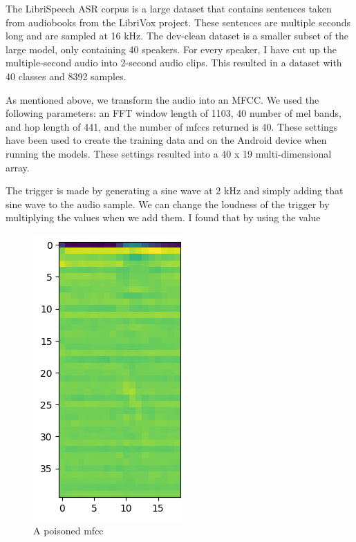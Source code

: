 \documentclass{article}
\theoremstyle{definition}
\theoremstyle{remark}
\begin{document}
The LibriSpeech ASR corpus is a large dataset that contains sentences taken from audiobooks from the LibriVox project. These sentences are multiple seconds long and are sampled at 16 kHz. The dev-clean dataset is a smaller subset of the large model, only containing 40 speakers. For every speaker, I have cut up the multiple-second audio into 2-second audio clips. This resulted in a dataset with 40 classes and 8392 samples.

As mentioned above, we transform the audio into an MFCC. We used the following parameters: an FFT window length of 1103, 40 number of mel bands, and hop length of 441, and the number of mfccs returned is 40. These settings have been used to create the training data and on the Android device when running the models. These settings resulted into a 40 x 19 multi-dimensional array.

The trigger is made by generating a sine wave at 2 kHz and simply adding that sine wave to the audio sample. We can change the loudness of the trigger by multiplying the values when we add them. I found that by using the value 

\begin{figure}[!hbt]
    \centering
    \includegraphics[scale=0.4]{img/mfcc.png}
    \caption{A poisoned mfcc}
    \label{fig:mfcc_poison}
\end{figure}
\end{document}
